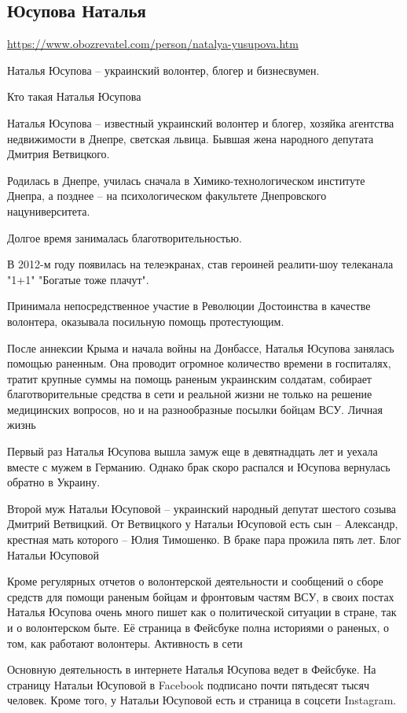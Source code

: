  
 
 
 
 
\subsection{Юсупова Наталья}
\url{https://www.obozrevatel.com/person/natalya-yusupova.htm}

Наталья Юсупова – украинский волонтер, блогер и бизнесвумен. 

Кто такая Наталья Юсупова

Наталья Юсупова – известный украинский волонтер и блогер, хозяйка агентства
недвижимости в Днепре, светская львица. Бывшая жена народного депутата Дмитрия
Ветвицкого.

Родилась в Днепре, училась сначала в Химико-технологическом институте Днепра, а
позднее – на психологическом факультете Днепровского нацуниверситета.

Долгое время занималась благотворительностью.

В 2012-м году появилась на телеэкранах, став героиней реалити-шоу телеканала
"1+1" "Богатые тоже плачут".

Принимала непосредственное участие в Революции Достоинства в качестве
волонтера, оказывала посильную помощь протестующим.

После аннексии Крыма и начала войны на Донбассе, Наталья Юсупова занялась
помощью раненным. Она проводит огромное количество времени в госпиталях, тратит
крупные суммы на помощь раненым украинским солдатам, собирает благотворительные
средства в сети и реальной жизни не только на решение медицинских вопросов, но
и на разнообразные посылки бойцам ВСУ.  Личная жизнь

Первый раз Наталья Юсупова вышла замуж еще в девятнадцать лет и уехала вместе с
мужем в Германию. Однако брак скоро распался и Юсупова вернулась обратно в
Украину.

Второй муж Натальи Юсуповой – украинский народный депутат шестого созыва
Дмитрий Ветвицкий. От Ветвицкого у Натальи Юсуповой есть сын – Александр,
крестная мать которого – Юлия Тимошенко. В браке пара прожила пять лет.  Блог
Натальи Юсуповой

Кроме регулярных отчетов о волонтерской деятельности и сообщений о сборе
средств для помощи раненым бойцам и фронтовым частям ВСУ, в своих постах
Наталья Юсупова очень много пишет как о политической ситуации в стране, так и о
волонтерском быте. Её страница в Фейсбуке полна историями о раненых, о том, как
работают волонтеры.  Активность в сети

Основную деятельность в интернете Наталья Юсупова ведет в Фейсбуке. На страницу
Натальи Юсуповой в Facebook подписано почти пятьдесят тысяч человек. Кроме
того, у Натальи Юсуповой есть и страница в соцсети Instagram.
